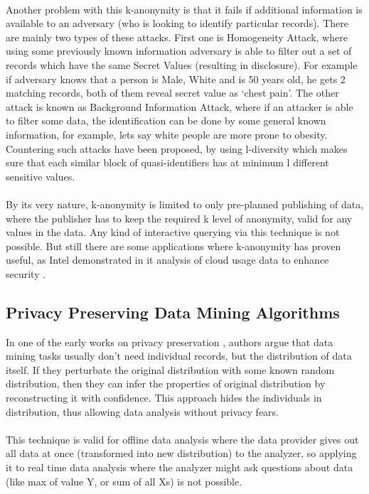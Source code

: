 \documentclass[12pt]{report}
\theoremstyle{named}
\begin{document}
\paragraph{}
Another problem with this k-anonymity is that it fails if additional information is available to an adversary (who is looking to identify particular records). There are mainly two types of these attacks. First one is Homogeneity Attack, where using some previously known information adversary is able to filter out a set of records which have the same Secret Values (resulting in disclosure). For example if adversary knows that a person is Male, White and is 50 years old, he gets 2 matching records, both of them reveal secret value as `chest pain'. The other attack is known as Background Information Attack, where if an attacker is able to filter some data, the identification can be done by some general known information, for example, lets say white people are more prone to obesity. Countering such attacks have been proposed, by using l-diversity \cite{machanavajjhala2006diversity} which makes sure that each similar block of quasi-identifiers has at minimum l different sensitive values.

\paragraph{}
By its very nature, k-anonymity is limited to only pre-planned publishing of data, where the publisher has to keep the required k level of anonymity, valid for any values in the data. Any kind of interactive querying via this technique is not possible. But still there are some applications where k-anonymity has proven useful, as Intel demonstrated in it analysis of cloud usage data to enhance security \cite{sedayao2012enhancing}. 




\subsection{Privacy Preserving Data Mining Algorithms}
In one of the early works on privacy preservation \cite{agrawal2001design}, authors argue that data mining tasks usually don’t need individual records, but the distribution of data itself. If they perturbate the original distribution with some known random distribution, then they can infer the properties of original distribution by reconstructing it with confidence. This approach hides the individuals in distribution, thus allowing data analysis without privacy fears.
\paragraph{}
This technique is valid for offline data analysis where the data provider gives out all data at once (transformed into new distribution) to the analyzer, so applying it to real time data analysis where the analyzer might ask questions about data (like max of value Y, or sum of all Xs) is not possible.
\end{document}
